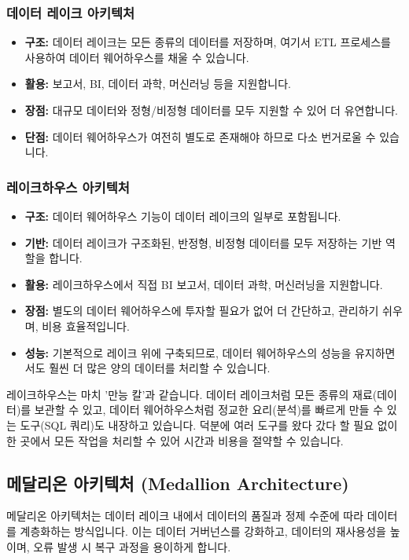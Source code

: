 \documentclass[11pt,a4paper]{article}
\begin{document}
\subsubsection{데이터 레이크 아키텍처}
\begin{itemize}
    \item \textbf{구조:} 데이터 레이크는 모든 종류의 데이터를 저장하며, 여기서 ETL 프로세스를 사용하여 데이터 웨어하우스를 채울 수 있습니다.
    \item \textbf{활용:} 보고서, BI, 데이터 과학, 머신러닝 등을 지원합니다.
    \item \textbf{장점:} 대규모 데이터와 정형/비정형 데이터를 모두 지원할 수 있어 더 유연합니다.
    \item \textbf{단점:} 데이터 웨어하우스가 여전히 별도로 존재해야 하므로 다소 번거로울 수 있습니다.
\end{itemize}

\subsubsection{레이크하우스 아키텍처}
\begin{itemize}
    \item \textbf{구조:} 데이터 웨어하우스 기능이 데이터 레이크의 일부로 포함됩니다.
    \item \textbf{기반:} 데이터 레이크가 구조화된, 반정형, 비정형 데이터를 모두 저장하는 기반 역할을 합니다.
    \item \textbf{활용:} 레이크하우스에서 직접 BI 보고서, 데이터 과학, 머신러닝을 지원합니다.
    \item \textbf{장점:} 별도의 데이터 웨어하우스에 투자할 필요가 없어 더 간단하고, 관리하기 쉬우며, 비용 효율적입니다.
    \item \textbf{성능:} 기본적으로 레이크 위에 구축되므로, 데이터 웨어하우스의 성능을 유지하면서도 훨씬 더 많은 양의 데이터를 처리할 수 있습니다.
\end{itemize}

\begin{tcolorbox}[myexample={레이크하우스의 장점}]
레이크하우스는 마치 '만능 칼'과 같습니다. 데이터 레이크처럼 모든 종류의 재료(데이터)를 보관할 수 있고, 데이터 웨어하우스처럼 정교한 요리(분석)를 빠르게 만들 수 있는 도구(SQL 쿼리)도 내장하고 있습니다. 덕분에 여러 도구를 왔다 갔다 할 필요 없이 한 곳에서 모든 작업을 처리할 수 있어 시간과 비용을 절약할 수 있습니다.
\end{tcolorbox}

\subsection{메달리온 아키텍처 (Medallion Architecture)}
메달리온 아키텍처는 데이터 레이크 내에서 데이터의 품질과 정제 수준에 따라 데이터를 계층화하는 방식입니다. 이는 데이터 거버넌스를 강화하고, 데이터의 재사용성을 높이며, 오류 발생 시 복구 과정을 용이하게 합니다.
\end{document}
